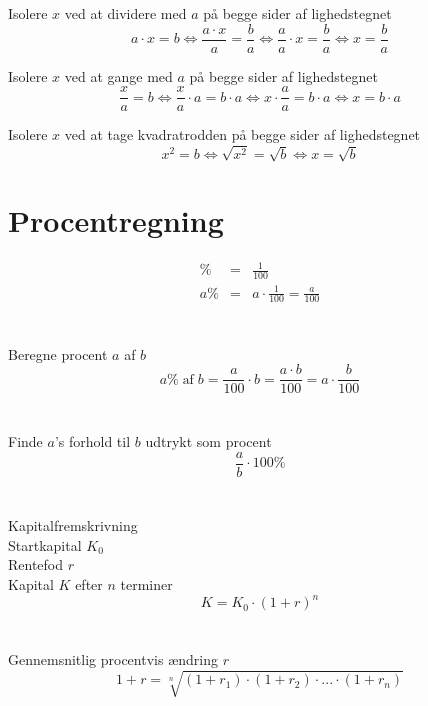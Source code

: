 \documentclass[11pt,a5paper,fleqn,leqno]{book}
\begin{document}
Isolere $x$ ved at dividere med $a$ på begge sider af lighedstegnet
\begin{equation} \label{eq:ligning_dividere}
a \cdot x = b \Leftrightarrow \frac{a \cdot x}{a} = \frac{b}{a} \Leftrightarrow \frac{a}{a} \cdot x = \frac{b}{a} \Leftrightarrow x = \frac{b}{a}
\end{equation}

Isolere $x$ ved at gange med $a$ på begge sider af lighedstegnet
\begin{equation} \label{eq:ligning_gange}
\frac{x}{a} = b \Leftrightarrow \frac{x}{a} \cdot a = b \cdot a \Leftrightarrow x \cdot \frac{a}{a} = b \cdot a \Leftrightarrow x = b \cdot a
\end{equation}

Isolere $x$ ved at tage kvadratrodden på begge sider af lighedstegnet
\begin{equation} \label{eq:ligning_kvadratrod}
x^2 = b \Leftrightarrow \sqrt{x^2} = \sqrt{b} \Leftrightarrow x = \sqrt{b}
\end{equation}

\newpage

\section{Procentregning}

\begin{eqnarray} \label{eq:procent}
\% & = & \frac{1}{100} \\
a\% & = & a \cdot \frac{1}{100} = \frac{a}{100} \nonumber
\end{eqnarray}
\\
\\
Beregne procent $a$ af $b$
\begin{equation} \label{eq:procent_beregne}
a\% \; \text{af} \; b = \frac{a}{100} \cdot b = \frac{a \cdot b}{100} = a \cdot \frac{b}{100}
\end{equation}
\\
\\
Finde $a$'s forhold til $b$ udtrykt som procent
\begin{equation} \label{eq:procent_finde}
\frac{a}{b} \cdot 100\% 
\end{equation}
\\
\\
Kapitalfremskrivning \\
Startkapital $K_0$ \\
Rentefod $r$ \\
Kapital $K$ efter $n$ terminer
\begin{equation} \label{eq:procent_kapital}
K = K_{0} \cdot \left(1+r\right)^{n}
\end{equation}
\\
\\
Gennemsnitlig procentvis ændring $r$
\begin{equation} \label{eq:procent_gennemsnit_aendring}
1+r = \sqrt[n]{\left(1+r_{1}\right) \cdot \left(1+r_{2}\right) \cdot ... \cdot \left(1+r_{n}\right)}
\end{equation} 
\end{document}

